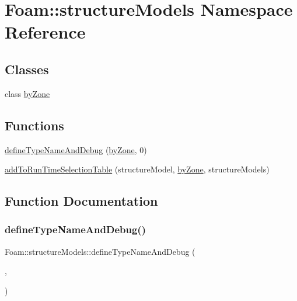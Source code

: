 \hypertarget{namespaceFoam_1_1structureModels}{}\section{Foam\+:\+:structure\+Models Namespace Reference}
\label{namespaceFoam_1_1structureModels}
\subsection*{Classes}
\begin{DoxyCompactItemize}
\item 
class \hyperlink{classFoam_1_1structureModels_1_1byZone}{by\+Zone}
\end{DoxyCompactItemize}
\subsection*{Functions}
\begin{DoxyCompactItemize}
\item 
\hyperlink{namespaceFoam_1_1structureModels_a18d5c3fd4467017391b954f71af42a6b}{define\+Type\+Name\+And\+Debug} (\hyperlink{classFoam_1_1structureModels_1_1byZone}{by\+Zone}, 0)
\item 
\hyperlink{namespaceFoam_1_1structureModels_a3871bada26ee0c224c6ff3906ab6b4ef}{add\+To\+Run\+Time\+Selection\+Table} (structure\+Model, \hyperlink{classFoam_1_1structureModels_1_1byZone}{by\+Zone}, structure\+Models)
\end{DoxyCompactItemize}


\subsection{Function Documentation}
\mbox{\label{namespaceFoam_1_1structureModels_a18d5c3fd4467017391b954f71af42a6b}} 
\subsubsection{\texorpdfstring{define\+Type\+Name\+And\+Debug()}{defineTypeNameAndDebug()}}
{\footnotesize\ttfamily Foam\+::structure\+Models\+::define\+Type\+Name\+And\+Debug (\begin{DoxyParamCaption}\item[{\hyperlink{classFoam_1_1structureModels_1_1byZone}{by\+Zone}}]{,  }\item[{0}]{ }\end{DoxyParamCaption})}

